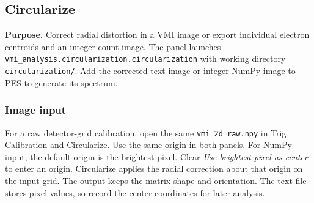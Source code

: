 \documentclass[11pt,a4paper]{article}
\newcommand{\code}[1]{\texttt{#1}}
\begin{document}
\subsection{Circularize}
\label{sec:circularize}

\textbf{Purpose.} Correct radial distortion in a VMI image or export
individual electron centroids and an integer count image. The panel launches
\code{vmi\_\allowbreak{}analysis.circularization.circularization} with working
directory \code{circularization/\allowbreak{}}. Add the corrected text image
or integer NumPy image to PES to generate its spectrum.

\subsubsection*{Image input}

For a raw detector-grid calibration, open the same \code{vmi\_2d\_raw.npy}
in Trig Calibration and Circularize. Use the same origin in both panels.
For NumPy input, the default origin is the brightest pixel. Clear
\emph{Use brightest pixel as center} to enter an origin.
Circularize applies the radial correction about that origin on the input
grid. The output keeps the matrix shape and orientation. The text file
stores pixel values, so record the center coordinates for later analysis.
\end{document}

